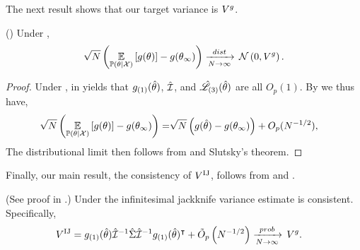 
The next result shows that
our target variance is $V^g$.

\begin{cor}(\cite[Theorem 10.8]{van:2000:asymptotic})
%
Under ,
%
\begin{align*}
%
\sqrt{N} \left( \expect{\post}{g(\theta)} - g(\thetatrue) \right)
    \dlim \normdist\left(0, \gcovtrue\right).
%
\end{align*}
%
%
\begin{proof}
%
Under ,  in 
yields that
$g_{(1)}(\hat\theta)$, $\hat{\mathcal{I}}$, and $\hat{\mathscr{L}}_{(3)}(\hat\theta)$ are all
$O_p(1)$.
%
By  we thus have,
%
\begin{align*}
%
\sqrt{N} \left( \expect{\post}{g(\theta)} - g(\thetatrue) \right) =&
\sqrt{N} \left( g(\thetahat) - g(\thetatrue) \right) + O_p(N^{-1/2}),
%
\end{align*}
%
The distributional limit then follows from  and Slutsky's
theorem.
%
\end{proof}
\end{cor}

Finally, our main result, the consistency of $V^{\mathrm{IJ}}$, follows from
 and .

\begin{thm}(See proof in .)
%
Under  the infinitesimal jackknife
variance estimate is consistent.  Specifically,
%
\begin{align*}
    V^{\mathrm{IJ}} ={}&
        g_{(1)}(\hat\theta) \hat{\mathcal{I}}^{-1}
            \hat\Sigma \hat{\mathcal{I}}^{-1} g_{(1)}(\hat\theta)^\intercal +
        \tilde{O}_p\left(N^{-1/2}\right)
        \xrightarrow[N\rightarrow\infty]{prob}\, V^g.
\end{align*}
%
\end{thm}
